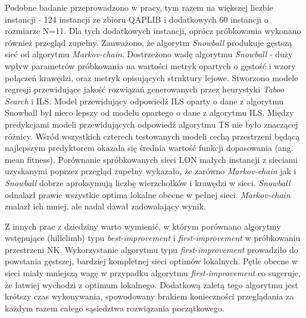 Podobne badanie przeprowadzono w pracy\cite{DBLP:journals/ec/ThomsonOVV20}, tym razem na większej liczbie instancji
- 124 instancji ze zbioru QAPLIB i dodatkowych 60 instancji o rozmiarze N=11.
Dla tych dodatkowych instancji, oprócz próbkowania wykonano również przegląd zupełny.
Zauważono, że algorytm \textit{Snowball} produkuje gęstszą sieć od algorytmu \textit{Markov-chain}.
Dostrzeżono wadę algorytmu \textit{Snowball} - duży wpływ parametrów próbkowania na wartości metryk opartych o gęstość
i wzory połączeń krawędzi, oraz metryk opisujących struktury lejowe.
Stworzono modele regresji przewidujące jakość rozwiązań generowanych przez heurystyki \textit{Taboo Search} i ILS.
Model przewidujący odpowiedź ILS oparty o dane z algorytmu Snowball był nieco lepszy od modelu opartego o dane z algorytmu ILS.
Między predykcjami modeli przewidujących odpowiedź algorytmu TS nie było znaczącej różnicy.
Wśród wszystkich czterech testowanych modeli cechą przestrzeni będącą najlepszym predyktorem okazała się średnia wartość
funkcji dopasowania (ang. mean fitness).
Porównanie spróbkowanych sieci LON małych instancji z sieciami uzyskanymi
poprzez przegląd zupełny wykazało, że zarówno \textit{Markov-chain} jak i \textit{Snowball}
dobrze aproksymują liczbę wierzchołków i krawędzi w sieci.
\textit{Snowball} odnalazł prawie wszystkie optima lokalne obecne w pełnej sieci.
\textit{Markov-chain} znalazł ich mniej, ale nadal dawał zadowalający wynik.

Z innych prac z dziedziny warto wymienić\cite{DBLP:journals/corr/abs-1207-4455}, w którym porównano algorytmy wstępujące (hillclimb)
typu \textit{best-improvement} i \textit{first-improvement} w próbkowaniu przestrzeni NK.
Wykorzystanie algorytmu typu \textit{first-improvement} prowadziło do powstania gęstszej, bardziej kompletnej sieci optimów lokalnych.
Pętle obecne w sieci miały mniejszą wagę w przypadku algorytmu \textit{first-improvement} co sugeruje, że łatwiej wychodzi z optimum lokalnego.
Dodatkową zaletą tego algorytmu jest krótszy czas wykonywania, spowodowany brakiem konieczności przeglądania za każdym razem całego sąsiedztwa
rozwiązania początkowego.

